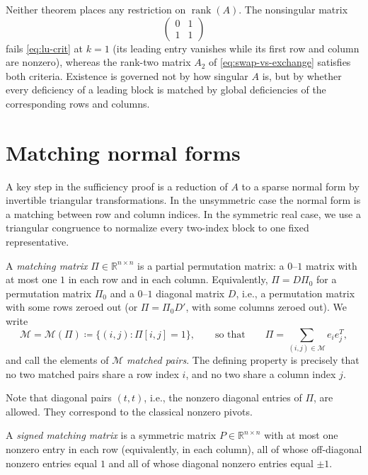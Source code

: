 \documentclass[preprint,12pt]{elsarticle}
\theoremstyle{plain}
\theoremstyle{nonumberplain}
\numberwithin{equation}{section}
\DeclareMathOperator{\rk}{rank}
\newcommand{\by}{\times}
\newcommand{\M}{\mathcal{M}}
\numberwithin{theorem}{section}
\begin{document}
\begin{remark}\label{rem:singular}
  Neither theorem places any restriction on $\rk(A)$.  The nonsingular matrix
  $$
  \begin{pmatrix}
    0 & 1\\ 1 & 1
  \end{pmatrix}
  $$
  fails \cref{eq:lu-crit} at $k = 1$ (its leading entry vanishes while its first row and column are nonzero), whereas the rank-two matrix $A_2$ of \cref{eq:swap-vs-exchange} satisfies both criteria.  Existence is governed not by how singular $A$ is, but by whether every deficiency of a leading block is matched by global deficiencies of the corresponding rows and columns.
\end{remark}

\section{Matching normal forms}\label{sec:normalforms}

A key step in the sufficiency proof is a reduction of $A$ to a sparse normal form by invertible triangular transformations.  In the unsymmetric case the normal form is a matching between row and column indices.  In the symmetric real case, we use a triangular congruence to normalize every two-index block to one fixed representative.

\begin{definition}\label{def:matching}
  A \emph{matching matrix} $\Pi \in \mathbb{R}^{n \by n}$ is a partial permutation matrix: a $0$--$1$ matrix with at most one $1$ in each row and in each column.  Equivalently, $\Pi = D\Pi_0$ for a permutation matrix $\Pi_0$ and a $0$--$1$ diagonal matrix $D$, i.e., a permutation matrix with some rows zeroed out (or $\Pi = \Pi_0 D'$, with some columns zeroed out). We write
  \[
    \M = \M(\Pi) \coloneq \{(i,j) \colon \Pi[i,j] = 1\},
    \qquad\text{so that}\qquad
    \Pi = \sum_{(i,j) \in \M} e_i e_j^T,
  \]
  and call the elements of $\M$ \emph{matched pairs}. The defining property is precisely that no two matched pairs share a row index $i$, and no two share a column index $j$.
\end{definition}

Note that diagonal pairs $(t,t)$, i.e., the nonzero diagonal entries of $\Pi$, are allowed. They correspond to the classical nonzero pivots.

\begin{definition}\label{def:sym-matching}
  A \emph{signed matching matrix} is a symmetric matrix $P \in \mathbb{R}^{n \by n}$ with at most one nonzero entry in each row (equivalently, in each column), all of whose off-diagonal nonzero entries equal $1$ and all of whose diagonal nonzero entries equal $\pm 1$.
\end{definition}
\end{document}
